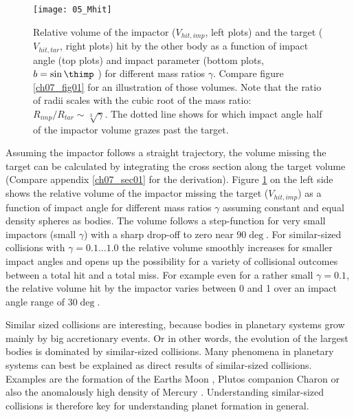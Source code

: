 \begin{figure}
\begin{center}
\texttt{[image: 05\_Mhit]}
\caption{Relative volume of the impactor ($V_{hit, imp}$, left plots) and the target ($V_{hit, tar}$, right plots) hit by the other body as a function of impact angle (top plots) and impact parameter (bottom plots, $b = \sin \thimp$ ) for different mass ratios $\gamma$. Compare figure \ref{ch07_fig01} for an illustration of those volumes. Note that the ratio of radii scales with the cubic root of the mass ratio: $R_{imp} / R_{tar} \sim \sqrt[3]{\gamma}$. The dotted line shows for which impact angle half of the impactor volume grazes past the target. } 
\label{ch03_fig05}
\end{center}
\end{figure}

Assuming the impactor follows a straight trajectory, the volume missing the target can be calculated by integrating the cross section along the target volume (Compare appendix \ref{ch07_sec01} for the derivation). Figure \ref{ch03_fig05} on the left side shows the relative volume of the impactor missing the target ($V_{hit, imp}$) as a function of impact angle for different mass ratios $\gamma$ assuming constant and equal density spheres as bodies. The volume follows a step-function for very small impactors (small $\gamma$) with a sharp drop-off to zero near $90 \deg$. For similar-sized collisions with $\gamma = 0.1 \dots 1.0$ the relative volume smoothly increases for smaller impact angles and opens up the possibility for a variety of collisional outcomes between a total hit and a total miss. For example even for a rather small $\gamma = 0.1$, the relative volume hit by the impactor varies between 0 and 1 over an impact angle range of $30 \deg$.

Similar sized collisions are interesting, because bodies in planetary systems grow mainly by big accretionary events. Or in other words, the evolution of the largest bodies is dominated by similar-sized collisions. Many phenomena in planetary systems can best be explained as direct results of similar-sized collisions. Examples are the formation of the Earths Moon \citep{Benz:1985p1755}, Plutos companion Charon \cite{Canup:2005p1987} or also the anomalously high density of Mercury \cite{Benz:1988p3336}. Understanding similar-sized collisions is therefore key for understanding planet formation in general.

